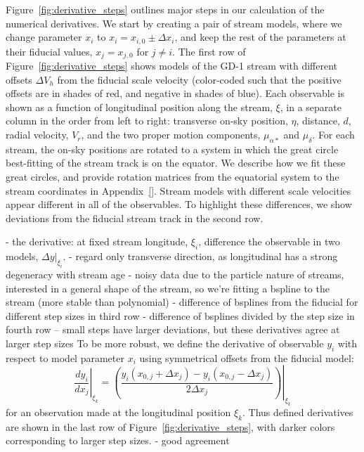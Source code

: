 \documentclass[modern]{aastex61}
\begin{document}
Figure~\ref{fig:derivative_steps} outlines major steps in our calculation of the numerical derivatives.
We start by creating a pair of stream models, where we change parameter $x_i$ to $x_i = x_{i,0} \pm \Delta x_i$, and keep the rest of the parameters at their fiducial values, $x_j = x_{j,0}$ for $j\neq i$.
The first row of Figure~\ref{fig:derivative_steps} shows models of the GD-1 stream with different offsets $\Delta V_{h}$ from the fiducial scale velocity (color-coded such that the positive offsets are in shades of red, and negative in shades of blue).
Each observable is shown as a function of longitudinal position along the stream, $\xi$, in a separate column in the order from left to right: transverse on-sky position, $\eta$, distance, $d$, radial velocity, $V_r$, and the two proper motion components, $\mu_{\alpha*}$ and $\mu_\delta$.
For each stream, the on-sky positions are rotated to a system in which the great circle best-fitting of the stream track is on the equator.
We describe how we fit these great circles, and provide rotation matrices from the equatorial system to the stream coordinates in Appendix~\ref{}.
Stream models with different scale velocities appear different in all of the observables.
To highlight these differences, we show deviations from the fiducial stream track in the second row.


- the derivative: at fixed stream longitude, $\xi_i$, difference the observable in two models, $\Delta y|_{\xi_i}$.
- regard only transverse direction, as longitudinal has a strong degeneracy with stream age
- noisy data due to the particle nature of streams, interested in a general shape of the stream, so we're fitting a bspline to the stream (more stable than polynomial)
- difference of bsplines from the fiducial for different step sizes in third row
- difference of bsplines divided by the step size in fourth row -- small steps have larger deviations, but these derivatives agree at larger step sizes
To be more robust, we define the derivative of observable $y_i$ with respect to model parameter $x_i$ using symmetrical offsets from the fiducial model:
\begin{equation}
\left.\frac{d y_i}{d x_j}\right\rvert_{\xi_k} = \left.\left(\frac{y_i(x_{0,j} + \Delta x_j) - y_i(x_{0,j} - \Delta x_j)}{2\Delta x_j}\right)\right\rvert_{\xi_k}
\label{eq:derivative}
\end{equation}
for an observation made at the longitudinal position $\xi_k$.
Thus defined derivatives are shown in the last row of Figure~\ref{fig:derivative_steps}, with darker colors corresponding to larger step sizes.
- good agreement
\end{document}
